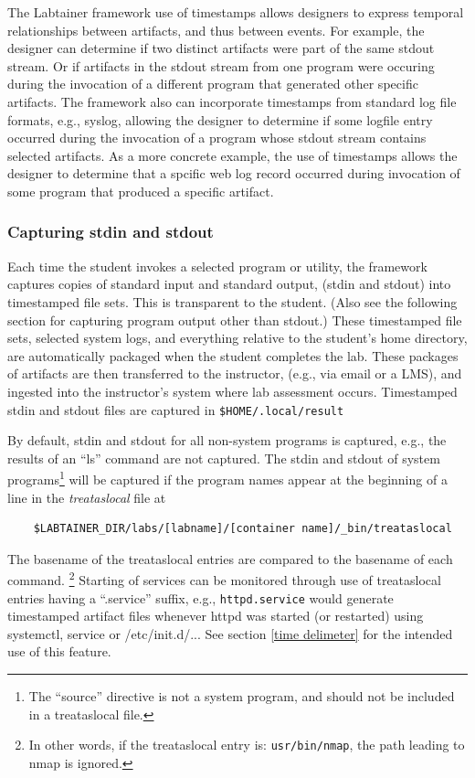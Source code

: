 \documentclass[12pt]{article}
\begin{document}
The Labtainer framework use of timestamps allows designers to express temporal 
relationships between artifacts, and thus between events.  For example, the designer can determine if
two distinct artifacts were part of the same stdout stream.  Or if artifacts in the stdout stream from one 
program were occuring during the invocation of a different program that generated other specific artifacts.  
The framework also can incorporate
timestamps from standard log file formats, e.g., syslog, allowing the designer to determine if some logfile
entry occurred during the invocation of a program whose stdout stream contains selected artifacts.
As a more concrete example, the use of timestamps allows the designer to determine that a spcific web log
record occurred during invocation of some program that produced a specific artifact.

\subsubsection{Capturing stdin and stdout}
\label{stdin and stdout}
Each time the student invokes a selected program or utility, the 
framework captures copies of standard input and standard output, (stdin and stdout) into timestamped file sets.
This is transparent to the student.  (Also see the following section for capturing
program output other than stdout.)  These timestamped file sets, selected system logs,  and everything relative to
the student's home directory, are automatically packaged when the student completes the lab.
These packages of artifacts are then transferred to the instructor, (e.g., via email or a LMS), and 
ingested into the instructor's system where lab assessment occurs. Timestamped stdin and stdout files
are captured in \texttt{\$HOME/.local/result}

By default, stdin and stdout for all non-system programs is captured, e.g., the results of an ``ls'' command
are not captured.  The stdin and stdout of system programs\footnote{The ``source'' directive is not a system
program, and should not be included in a treataslocal file.} will be captured if the program
names appear at the beginning of a line in the \textit{treataslocal} file at
\begin{verbatim}
    $LABTAINER_DIR/labs/[labname]/[container name]/_bin/treataslocal
\end{verbatim}
\noindent The basename of the treataslocal entries are compared to the basename of each command.
\footnote{In other words, if the treataslocal entry is: \texttt{usr/bin/nmap}, the path leading to nmap is ignored.}
Starting of services can be monitored through use of treataslocal entries having a ``.service'' suffix,
e.g., {\tt httpd.service} would generate timestamped artifact files whenever httpd was started (or restarted)
using systemctl, service or /etc/init.d/...  See section \ref{time delimeter} for the intended use of this feature.
\end{document}
